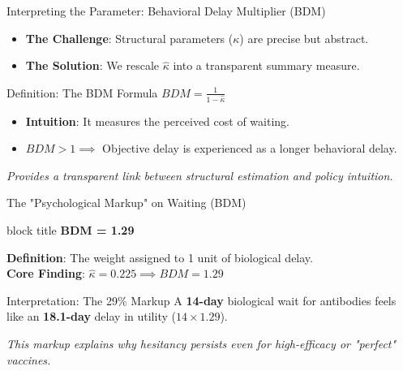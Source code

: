 \documentclass[10pt]{beamer}
\begin{document}
\begin{frame}{Interpreting the Parameter: Behavioral Delay Multiplier (BDM)}
\begin{itemize}
\item \textbf{The Challenge}: Structural parameters ($\kappa$) are precise but abstract.
\item \textbf{The Solution}: We rescale $\hat{\kappa}$ into a transparent summary measure.
\end{itemize}

\begin{exampleblock}{Definition: The BDM Formula}
\centering
\large $BDM = \frac{1}{1 - \hat{\kappa}}$
\end{exampleblock}

\vspace{0.4cm}
\begin{itemize}
\item \textbf{Intuition}: It measures the \alert{perceived cost of waiting}.
\item $BDM > 1 \implies$ Objective delay is experienced as a longer behavioral delay.
\end{itemize}
\vfill
\centering \scriptsize \textit{Provides a transparent link between structural estimation and policy intuition.}
\end{frame}

\begin{frame}{The "Psychological Markup" on Waiting (BDM)}
    \begin{center}
        \begin{beamercolorbox}[sep=1em, wd=0.6\textwidth, center]{block title}
            \Huge \alert{\textbf{BDM = 1.29}}
        \end{beamercolorbox}
    \end{center}

    \textbf{Definition}: The weight assigned to 1 unit of biological delay. \\
    \textbf{Core Finding}: $\hat{\kappa} = 0.225 \implies BDM = 1.29$ 
    
    \vspace{0.3cm}

    \begin{exampleblock}{Interpretation: The 29\% Markup}
        \small A \textbf{14-day} biological wait for antibodies feels like an \alert{\textbf{18.1-day}} delay in utility ($14 \times 1.29$).
    \end{exampleblock}

    \vfill
    \textit{This markup explains why hesitancy persists even for \alert{high-efficacy} or "perfect" vaccines.}
\end{frame}
\end{document}
